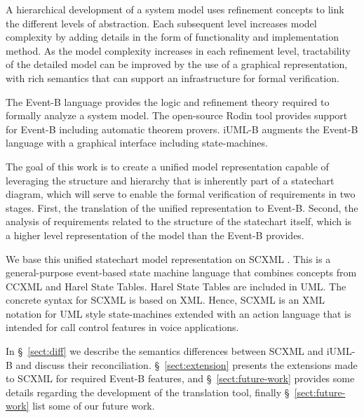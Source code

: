 \documentclass{easychair}
\begin{document}
A hierarchical development of a system model uses 
refinement concepts to link the different levels
of abstraction. Each subsequent level increases model 
complexity by adding details in the form of functionality and 
implementation method. As the model complexity increases 
in each refinement level, tractability of the detailed 
model can be improved by the use of a graphical representation, 
with rich semantics that can support an infrastructure 
for formal verification.

The Event-B language \cite{abrial10:_model_event_b} provides the logic and refinement
theory required to formally analyze a system model. 
The open-source Rodin tool \cite{abrial10:_rodin} provides support for Event-B including automatic theorem provers.
iUML-B \cite{snook14:_b_statem} augments the Event-B language with a graphical interface including state-machines.
 
 The goal of this work is to create a unified model 
representation capable of leveraging the structure and 
hierarchy that is inherently part of a statechart 
diagram, which will serve to enable the formal verification
of requirements in two stages. First, 
the translation of the unified representation to Event-B. Second,
the analysis of requirements related to the structure of 
the statechart itself, which is a higher level representation 
of the model than the Event-B provides. 

We base this unified statechart model representation 
on SCXML  \cite{scxmlwebsite}.  This is a general-purpose event-based state machine 
language that combines concepts from CCXML and Harel 
State Tables. Harel State Tables are included in UML. 
The concrete syntax for SCXML
is based on XML. Hence, SCXML is an XML notation for 
UML style state-machines extended with an action 
language that is intended for call control features 
in voice applications.

In \S~\ref{sect:diff} we describe the semantics differences between SCXML and iUML-B 
and discuss their reconciliation. \S~\ref{sect:extension} presents the extensions 
made to SCXML for required Event-B  features, and \S~\ref{sect:future-work} provides some details 
regarding the development of the translation tool, finally \S~\ref{sect:future-work} list some of our future work. 

\end{document}
